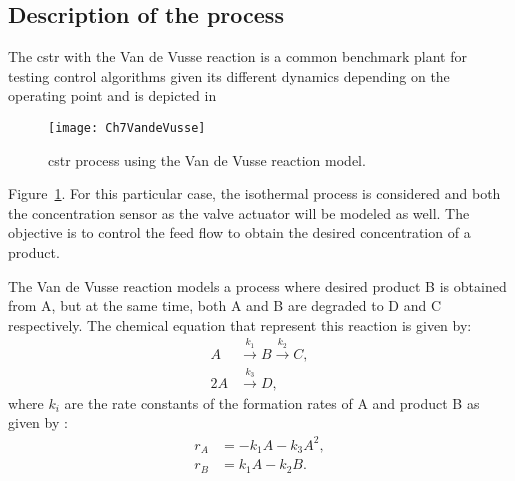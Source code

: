 \subsection{Description of the process}
\label{sec:DescriptionCSTH}

The \gls{cstr} with the Van de Vusse reaction \citep{VandeVusse1964} is a common benchmark plant for testing control algorithms given its different dynamics depending on the operating point and is depicted in %
\begin{figure}[tb]
	\centering
	\texttt{[image: Ch7VandeVusse]}
	\caption{\gls{cstr} process using the Van de Vusse reaction model.}
	\label{fig:Ch7VandeVusse}
\end{figure}
%
Figure~\ref{fig:Ch7VandeVusse}. For this particular case, the isothermal process is considered and both the concentration sensor as the valve actuator will be modeled as well. The objective is to control the feed flow to obtain the desired concentration of a product.

The Van de Vusse reaction models a process where desired product B is obtained from A, but at the same time, both A and B are degraded to D and C respectively. The chemical equation that represent this reaction is given by:
%
\begin{align*}
A &\overset{k_1}{\longrightarrow} B \overset{k_2}{\longrightarrow}C,\\
2 A &\overset{k_3}{\longrightarrow} D,
\end{align*}
%
where $k_i$ are the rate constants of the formation rates of A and product B as given by \citep{VandeVusse1964}:
\begin{equation}
\begin{split}
r_A &= -k_1 A - k_3 A^2,\\
r_B &= k_1 A - k_2 B.
\end{split}
\label{eq:RateVandeVusse}
\end{equation}

